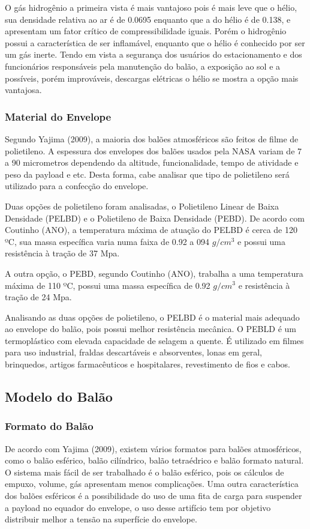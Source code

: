 	O gás hidrogênio a primeira vista é mais vantajoso pois é mais leve que o hélio, sua densidade relativa ao ar é de 0.0695 enquanto que a do hélio é de 0.138, e apresentam um fator crítico de compressibilidade iguais. Porém o hidrogênio possui a característica de ser inflamável, enquanto que o hélio é conhecido por ser um gás inerte. Tendo em vista a segurança dos usuários do estacionamento e dos funcionários responsáveis pela manutenção do balão, a exposição ao sol e a possíveis, porém improváveis,  descargas elétricas o hélio se mostra a opção mais vantajosa.

	\subsubsection{Material do Envelope}

	Segundo Yajima (2009), a maioria dos balões atmosféricos são feitos de filme de polietileno. A espessura dos envelopes dos balões usados pela NASA variam de 7 a 90 micrometros dependendo da altitude, funcionalidade, tempo de atividade e peso da payload e etc. Desta forma, cabe analisar que tipo de polietileno será utilizado para a confecção do envelope.

	Duas opções de polietileno foram analisadas, o Polietileno Linear de Baixa Densidade (PELBD) e o Polietileno de Baixa Densidade (PEBD). De acordo com Coutinho (ANO), a temperatura máxima de atuação do PELBD é cerca de 120 ºC, sua massa específica varia numa faixa de 0.92 a 094 $g/cm^3$ e possui uma resistência à tração de 37 Mpa.

	A outra opção, o PEBD, segundo Coutinho (ANO), trabalha a uma temperatura máxima de 110 ºC, possui uma massa específica de 0.92 $g/cm^3$ e resistência à tração de 24 Mpa.

	Analisando as duas opções de polietileno, o PELBD é o material mais adequado ao envelope do balão, pois possui melhor resistência mecânica. O PEBLD é um termoplástico com elevada capacidade de selagem a quente. É utilizado em filmes para uso industrial, fraldas descartáveis e absorventes, lonas em geral, brinquedos, artigos farmacêuticos e hospitalares, revestimento de fios e cabos.


\subsection{Modelo do Balão} %
\label{sub:modelo_do_bal_o}

\subsubsection{Formato do Balão}
	De acordo com Yajima (2009), existem vários formatos para balões atmosféricos, como o balão esférico, balão cilíndrico, balão tetraédrico e balão formato natural. O sistema mais fácil de ser trabalhado é o balão esférico, pois os cálculos de empuxo, volume, gás  apresentam menos complicações. Uma outra característica dos balões esféricos é a possibilidade do uso de uma fita de carga para suspender a payload no equador do envelope, o uso desse artifício tem por objetivo distribuir melhor a tensão na superfície do envelope.

